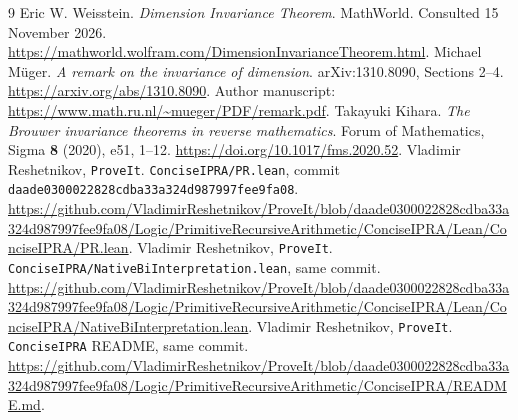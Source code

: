 \documentclass[11pt,a4paper]{article}
\theoremstyle{definition}
\newcommand{\repo}{\texttt{ProveIt}}
\newcommand{\sha}{\texttt{daade0300022828cdba33a324d987997fee9fa08}}
\begin{document}
\begin{thebibliography}{9}
Eric W. Weisstein.
\emph{Dimension Invariance Theorem}. MathWorld.
Consulted 15 November 2026.
\url{https://mathworld.wolfram.com/DimensionInvarianceTheorem.html}.
Michael M\"uger.
\emph{A remark on the invariance of dimension}.
arXiv:1310.8090, Sections 2--4.
\url{https://arxiv.org/abs/1310.8090}.
Author manuscript:
\url{https://www.math.ru.nl/~mueger/PDF/remark.pdf}.
Takayuki Kihara.
\emph{The Brouwer invariance theorems in reverse mathematics}.
Forum of Mathematics, Sigma \textbf{8} (2020), e51, 1--12.
\url{https://doi.org/10.1017/fms.2020.52}.
Vladimir Reshetnikov, \repo.
\texttt{ConciseIPRA/PR.lean}, commit \sha.
\url{https://github.com/VladimirReshetnikov/ProveIt/blob/daade0300022828cdba33a324d987997fee9fa08/Logic/PrimitiveRecursiveArithmetic/ConciseIPRA/Lean/ConciseIPRA/PR.lean}.
Vladimir Reshetnikov, \repo.
\texttt{ConciseIPRA/NativeBiInterpretation.lean}, same commit.
\url{https://github.com/VladimirReshetnikov/ProveIt/blob/daade0300022828cdba33a324d987997fee9fa08/Logic/PrimitiveRecursiveArithmetic/ConciseIPRA/Lean/ConciseIPRA/NativeBiInterpretation.lean}.
Vladimir Reshetnikov, \repo.
\texttt{ConciseIPRA} README,
same commit.
\url{https://github.com/VladimirReshetnikov/ProveIt/blob/daade0300022828cdba33a324d987997fee9fa08/Logic/PrimitiveRecursiveArithmetic/ConciseIPRA/README.md}.
\end{thebibliography}
\end{document}
